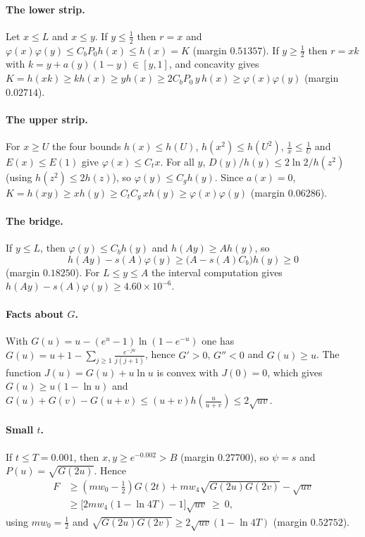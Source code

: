\documentclass[aps,prd,twocolumn,superscriptaddress,nofootinbib,longbibliography,floatfix,amsmath,amssymb,10pt]{revtex4-2}
\theoremstyle{plain}
\theoremstyle{definition}
\theoremstyle{plain}
\begin{document}
\paragraph*{The lower strip.} Let $x\le L$ and $x\le y$. If $y\le\frac12$ then $r=x$ and $\varphi(x)\varphi(y)\le C_bP_0h(x)\le h(x)=K$ (margin $0.51357$). If $y\ge\frac12$ then $r=xk$ with $k=y+a(y)(1-y)\in[y,1]$, and concavity gives $K=h(xk)\ge kh(x)\ge yh(x)\ge 2C_bP_0\,y\,h(x)\ge\varphi(x)\varphi(y)$ (margin $0.02714$).

\paragraph*{The upper strip.} For $x\ge U$ the four bounds $h(x)\le h(U)$, $h(x^2)\le h(U^2)$, $\frac1x\le\frac1U$ and $E(x)\le E(1)$ give $\varphi(x)\le C_tx$. For all $y$, $D(y)/h(y)\le 2\ln 2/h(z^2)$ (using $h(z^2)\le 2h(z)$), so $\varphi(y)\le C_gh(y)$. Since $a(x)=0$, $K=h(xy)\ge xh(y)\ge C_tC_g\,xh(y)\ge\varphi(x)\varphi(y)$ (margin $0.06286$).

\paragraph*{The bridge.} If $y\le L$, then $\varphi(y)\le C_bh(y)$ and $h(Ay)\ge Ah(y)$, so
\[
h(Ay)-s(A)\varphi(y)\ge\bigl(A-s(A)C_b\bigr)h(y)\ge 0
\]
(margin $0.18250$). For $L\le y\le A$ the interval computation gives $h(Ay)-s(A)\varphi(y)\ge 4.60\times10^{-6}$.

\paragraph*{Facts about $G$.} With $G(u)=u-(e^u-1)\ln(1-e^{-u})$ one has $G(u)=u+1-\sum_{j\ge1}\frac{e^{-ju}}{j(j+1)}$, hence $G'>0$, $G''<0$ and $G(u)\ge u$. The function $J(u)=G(u)+u\ln u$ is convex with $J(0)=0$, which gives $G(u)\ge u(1-\ln u)$ and $G(u)+G(v)-G(u+v)\le(u+v)h(\frac{u}{u+v})\le 2\sqrt{uv}$.

\paragraph*{Small $t$.} If $t\le T=0.001$, then $x,y\ge e^{-0.002}>B$ (margin $0.27700$), so $\psi=s$ and $P(u)=\sqrt{G(2u)}$. Hence
\begin{align*}
F&\ge(mw_0-\tfrac12)G(2t)+mw_4\sqrt{G(2u)G(2v)}-\sqrt{uv}\\
&\ge\bigl[2mw_4(1-\ln 4T)-1\bigr]\sqrt{uv}\ \ge\ 0,
\end{align*}
using $mw_0=\frac12$ and $\sqrt{G(2u)G(2v)}\ge 2\sqrt{uv}(1-\ln 4T)$ (margin $0.52752$).
\end{document}
